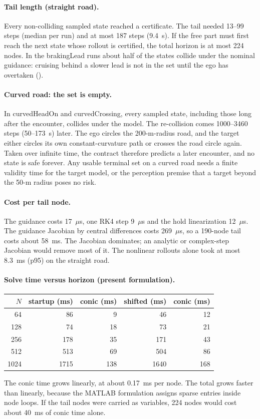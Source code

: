 \documentclass[11pt]{article}
\begin{document}
\paragraph{Tail length (straight road).} Every non-colliding sampled state
reached a certificate. The tail needed 13--99 steps (median per run) and at
most 187 steps (9.4~s). If the free part must first reach the next state whose
rollout is certified, the total horizon is at most 224 nodes. In the
brakingLead runs about half of the states collide under the nominal guidance:
cruising behind a slower lead is not in the set until the ego has overtaken
().

\paragraph{Curved road: the set is empty.} In curvedHeadOn and curvedCrossing,
every sampled state, including those long after the encounter, collides under
the model. The re-collision comes 1000--3460 steps (50--173~s) later. The ego
circles the 200-m-radius road, and the target either circles its own
constant-curvature path or crosses the road circle again. Taken over infinite
time, the contract therefore predicts a later encounter, and no state is safe
forever. Any usable terminal set on a curved road needs a finite validity time
for the target model, or the perception premise that a target beyond the 50-m
radius poses no risk.

\paragraph{Cost per tail node.} The guidance costs 17~$\mu$s, one RK4 step
9~$\mu$s and the hold linearization 12~$\mu$s. The guidance Jacobian by
central differences costs 269~$\mu$s, so a 190-node tail costs about 58~ms. The
Jacobian dominates; an analytic or complex-step Jacobian would remove most of
it. The nonlinear rollouts alone took at most 8.3~ms (p95) on the straight road.

\paragraph{Solve time versus horizon (present formulation).}
\begin{center}
\begin{tabular}{rrrrr}
\toprule
$N$ & startup (ms) & conic (ms) & shifted (ms) & conic (ms)\\
\midrule
64 & 86 & 9 & 46 & 12\\
128 & 74 & 18 & 73 & 21\\
256 & 178 & 35 & 171 & 43\\
512 & 513 & 69 & 504 & 86\\
1024 & 1715 & 138 & 1640 & 168\\
\bottomrule
\end{tabular}
\end{center}
The conic time grows linearly, at about 0.17~ms per node. The total grows
faster than linearly, because the MATLAB formulation assigns sparse entries
inside node loops. If the tail nodes were carried as variables, 224 nodes would
cost about 40~ms of conic time alone.
\end{document}

